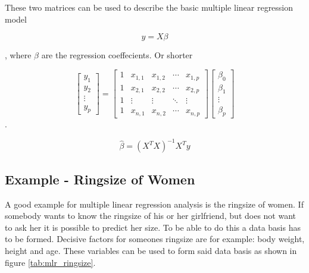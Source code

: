These two matrices can be used to describe the basic multiple linear regression model

\begin{equation}
    y = X\beta
\end{equation}

, where $ \beta $ are the regression coeffecients. Or shorter

\begin{equation}
    \begin{bmatrix}
        y_{1} \\
        y_{2} \\
        \vdots \\
        y_{p}
    \end{bmatrix}
    =
    \begin{bmatrix}
            1 & x_{1,1} & x_{1,2} & \cdots & x_{1,p} \\
            1 & x_{2,1} & x_{2,2} & \cdots & x_{2,p} \\
            1 & \vdots & \vdots & \ddots & \vdots \\
            1 & x_{n,1} & x_{n,2} & \cdots & x_{n,p}
    \end{bmatrix}
    \begin{bmatrix}
        \beta_{0} \\
        \beta_{1} \\
        \vdots \\
        \beta_{p}
    \end{bmatrix}
\end{equation} .


\begin{equation}
\label{eq:mlr}
    \hat{\beta} = (X^TX)^{-1} X^Ty
\end{equation}

\subsection{Example - Ringsize of Women}

A good example for multiple linear regression analysis is the ringsize of women. If somebody wants to know the ringsize of his or her girlfriend, but does not want to ask her it is possible to predict her size. To be able to do this a data basis has to be formed. Decisive factors for someones ringsize are for example: body weight, height and age. These variables can be used to form said data basis as shown in figure \vref{tab:mlr_ringsize}.

